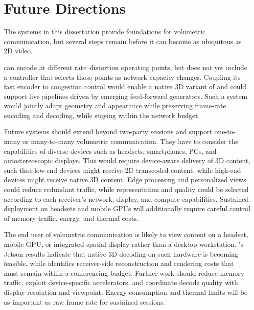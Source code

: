 \section{Future Directions}
\label{sec:future}
%
The systems in this dissertation provide foundations for volumetric communication, but several steps remain before it can become as ubiquitous as 2D video.

%
\gsnfs can encode at different rate--distortion operating points, but does not yet include a controller that selects those points as network capacity changes. 
%
Coupling its fast encoder to congestion control would enable a native 3D variant of \livo and could support live \gs pipelines driven by emerging feed-forward generators. 
%
Such a system would jointly adapt geometry and appearance while preserving frame-rate encoding and decoding, while staying within the network budget.

%
Future systems should extend \livo beyond two-party sessions and support one-to-many or many-to-many volumetric communication.
%
They have to consider the capabilities of diverse devices such as headsets, smartphones, PCs, and autostereoscopic displays. 
%
This would require device-aware delivery of 3D content, such that low-end devices might receive 2D transcoded content, while high-end devices might receive native 3D content.
%
Edge processing and personalized views could reduce redundant traffic, while representation and quality could be selected according to each receiver's network, display, and compute capabilities. 
%
Sustained deployment on headsets and mobile GPUs will additionally require careful control of memory traffic, energy, and thermal costs.

%
The end user of volumetric communication is likely to view content on a headset, mobile GPU, or integrated spatial display rather than a desktop workstation. 
%
\gsnfs's Jetson results indicate that native 3D decoding on such hardware is becoming feasible, while \livo identifies receiver-side reconstruction and rendering costs that must remain within a conferencing budget. 
%
Further work should reduce memory traffic, exploit device-specific accelerators, and coordinate decode quality with display resolution and viewpoint. 
%
Energy consumption and thermal limits will be as important as raw frame rate for sustained sessions.

